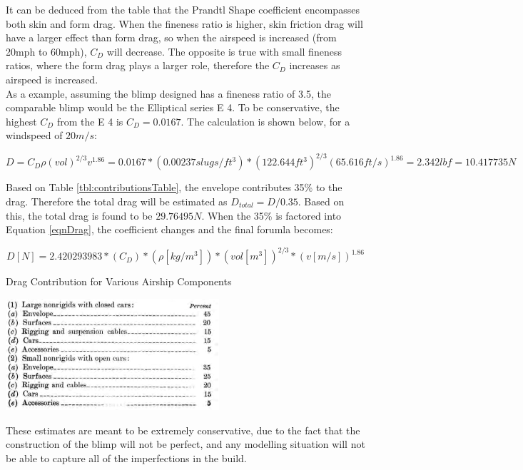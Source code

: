 \documentclass[../main.tex]{subfiles}
\begin{document}
It can be deduced from the table that the Prandtl Shape coefficient encompasses both skin and form drag. When the fineness ratio is higher, skin friction drag will have a larger effect than form drag, so when the airspeed is increased (from 20mph to 60mph), $C_D$ will decrease. The opposite is true with small fineness ratios, where the form drag plays a larger role, therefore the $C_D$ increases as airspeed is increased. \\

As a example, assuming the blimp designed has a fineness ratio of 3.5, the comparable blimp would be the Elliptical series E 4. To be conservative, the highest $C_D$ from the E 4 is $C_D = 0.0167$. The calculation is shown below, for a windspeed of $20m/s$:

\begin{equation*} \label{exDrag}
D = C_D\rho (vol)^{2/3}v^{1.86}=0.0167*(0.00237 slugs/ft^3)*(122.644 ft^3)^{2/3}(65.616 ft/s) ^{1.86} = 2.342 lbf = 10.417735N 
\end{equation*}

Based on Table \ref{tbl:contributionsTable}, the envelope contributes 35\% to the drag. Therefore the total drag will be estimated as $D_{total}=D/0.35$. Based on this, the total drag is found to be $29.76495N$. When the 35\% is factored into Equation \ref{eqnDrag}, the coefficient changes and the final forumla becomes:

\begin{equation} \label{eqnDrag2}
D[N] = 2.420293983*(C_D)*(\rho[kg/m^3])*(vol [m^3])^{2/3}*(v [m/s])^{1.86}
\end{equation}

\begin{table}[H]
	\centering
	\caption{Drag Contribution for Various Airship Components \cite{airshipAerodynamics}}
	\includegraphics[width=.5\linewidth]{img/drag/contributions.PNG}
	\label{tbl:contributionsTable}
\end{table}

These estimates are meant to be extremely conservative, due to the fact that the construction of the blimp will not be perfect, and any modelling situation will not be able to capture all of the imperfections in the build.\\
\end{document}
